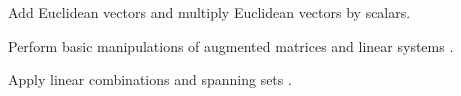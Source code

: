 \begin{readinessAssuranceOutcomes}
\item Add Euclidean vectors and multiply Euclidean vectors by scalars.
\item Perform basic manipulations of augmented matrices and linear
systems .
\item Apply linear combinations and spanning sets .
\end{readinessAssuranceOutcomes}
